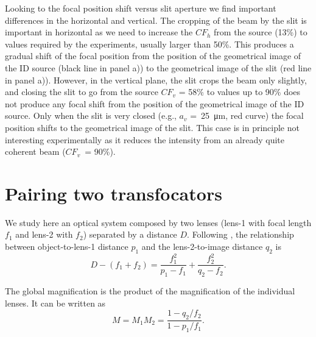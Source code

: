 \documentclass{iucr}              %
\begin{document}
Looking to the focal position shift versus slit aperture we find important differences in the horizontal and vertical. The cropping of the beam by the slit is important in horizontal as we need to increase the $CF_h$ from the source (13\%) to values required by the experiments, usually larger than 50\%. This produces a gradual shift of the focal position from the position of the geometrical image of the ID source (black line in panel a)) to the geometrical image of the slit (red line in panel a)). However, in the vertical plane, the slit crops the beam only slightly, and closing the slit to go from the source $CF_v$ = 58\% to values up to 90\% does not produce any focal shift from the position of the geometrical image of the ID source. Only when the slit is very closed (e.g., $a_v$ =~\SI{25}{\micro\meter}, red curve) the focal position shifts to the geometrical image of the slit. This case is in principle not interesting experimentally as it reduces the intensity from an already quite coherent beam ($CF_v$~= 90\%). 




\section{Pairing two transfocators}\label{sec:twolenses}


We study here an optical system composed by two lenses (lens-1 with focal length $f_1$ and lens-2 with $f_2$) separated by a distance $D$. Following , the relationship between object-to-lens-1 distance $p_1$ and the lens-2-to-image distance $q_2$ is
\begin{equation}
\label{eq:twolens}
    D-(f_1+f_2)=\frac{f_1^2}{p_1-f_1} + \frac{f_2^2}{q_2-f_2}.
\end{equation}

The global magnification is the product of the magnification of the individual lenses. It can be written as
\begin{equation}
\label{eq:magnification}
    M=M_1 M_2=\frac{1-q_2/f_2}{1-p_1/f_1}.
\end{equation}
\end{document}
